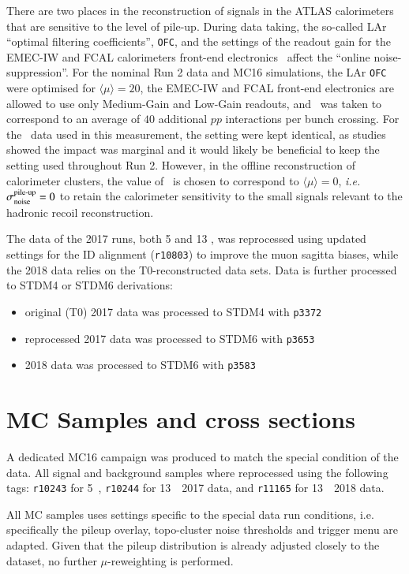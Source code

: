 There are two places in the reconstruction of signals in the ATLAS
calorimeters that are sensitive to the level of pile-up. During data
taking, the so-called LAr ``optimal filtering coefficients'',
\texttt{OFC}, and the settings of the readout gain for the EMEC-IW and
FCAL calorimeters front-end electronics~\cite{LARG-2009-01} affect the
``online noise-suppression''.  For the nominal Run 2 data and MC16
simulations, the LAr \texttt{OFC} were optimised for
$\langle\mu\rangle = 20$, the EMEC-IW and FCAL front-end electronics
are allowed to use only Medium-Gain and Low-Gain readouts, and \sigPU\
was taken to correspond to an average of $40$ additional $pp$
interactions per bunch crossing. For the \lowmu\ data used in this
measurement, the setting were kept identical, as studies showed the
impact was marginal and it would likely be beneficial to keep the
setting used throughout Run 2. However, in the offline reconstruction
of calorimeter clusters, the value of \sigPU\ is chosen to correspond
to $\langle\mu\rangle = 0$, \textit{i.e.} $\sigma_{\text{noise}}^{\text{pile-up}} = 0$ to retain the
calorimeter sensitivity to the small signals relevant to the hadronic
recoil reconstruction.


The data of the 2017 runs, both 5 and 13 \TeV, was reprocessed using
updated settings for the ID alignment (\texttt{r10803}) to improve the
muon sagitta biases, while the 2018 data relies on the
T0-reconstructed data sets. Data is further processed to STDM4 or
STDM6 derivations:
\begin{itemize}
\item original (T0) 2017 data was processed to STDM4 with \texttt{p3372}
\item reprocessed 2017 data was processed to STDM6 with \texttt{p3653}
\item 2018 data was processed to STDM6 with \texttt{p3583}
\end{itemize}

\section{MC Samples and cross sections}
\label{sec:mcsamples}

A dedicated MC16 campaign was produced to match the special condition
of the \lowmu data.  All signal and background samples where
reprocessed using the following tags: \texttt{r10243} for 5~\TeV,
\texttt{r10244} for 13~\TeV\ 2017 data, and \texttt{r11165} for
13~\TeV\ 2018 data. 

All MC samples uses settings specific to the special data run conditions, 
i.e. specifically the pileup overlay, topo-cluster noise thresholds and trigger 
menu are adapted. Given that the pileup distribution is already adjusted closely to the dataset, 
no further $\mu$-reweighting is performed.

